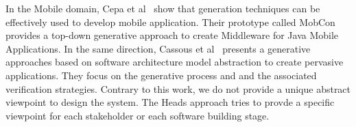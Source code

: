 In the Mobile domain, Cepa et al~\cite{1385821} show that generation techniques can be effectively used to develop mobile application.  Their prototype called MobCon provides a top-down generative approach to create Middleware for Java Mobile Applications. In the same direction, Cassous et al~\cite{Cassou:2011:LSA:1985793.1985852} presents a generative approaches based on software architecture model abstraction to create pervasive applications. They focus on the generative process and and the associated verification strategies. Contrary to this work, we do not provide a unique abstract viewpoint to design the system. The Heads approach tries to provde a specific viewpoint for each stakeholder or each software building stage.

